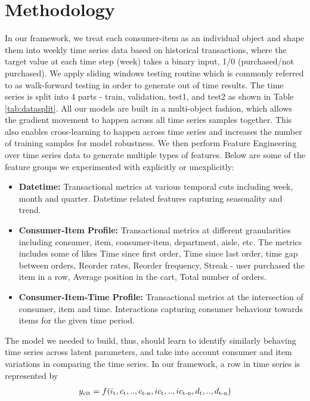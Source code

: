 \section{Methodology}
\label{sec:methodology}
In our framework, we treat each consumer-item as an individual object and shape them into weekly time series data
based on historical transactions, where the target value at each time step (week) takes a binary input, 1/0 
(purchased/not purchased).
We apply sliding windows testing routine which is commonly referred to as walk-forward testing in order to generate 
out of time results. The time series is split into 4 parts - train, validation, 
test1, and test2 as shown in Table \ref{tab:datasplit}. All our models are built in a multi-object 
fashion, which allows the gradient movement to happen across all time series samples together. This also enables 
cross-learning to happen across time series and increases the number of training samples for model 
robustness. We then perform Feature Engineering over time series data to generate multiple types of features. 
Below are some of the feature groups we experimented with explicitly or unexplicitly:
\begin{itemize}
\item {\bf Datetime:} Transactional metrics at various temporal cuts including week, month and quarter. 
Datetime related features capturing seasonality and trend.
\item {\bf Consumer-Item Profile:} Transactional metrics at different granularities including consumer, item,
consumer-item, department, aisle, etc. The metrics includes some of likes Time since first order, 
Time since last order, time gap between orders, Reorder rates, Reorder frequency, 
Streak - user purchased the item in a row, Average position in the cart, Total number of orders.
\item {\bf Consumer-Item-Time Profile:} Transactional metrics at the intersection of consumer, item and time.
Interactions capturing consumer behaviour towards items for the given time period.
\end{itemize}
The model we needed to build, thus, should learn to identify similarly behaving time series across latent
parameters, and take into account consumer and item variations in comparing the time series. In our framework, a row 
in time series is represented by
  \begin{equation}
    \begin{array}{l}
      y\textsubscript{cit}  = f(i\textsubscript{t}, c\textsubscript{t},..,c\textsubscript{t-n}, ic\textsubscript{t}
      ,..,ic\textsubscript{t-n}, d\textsubscript{t},..,d\textsubscript{t-n})
    \end{array}
    \label{eqn:fx}
  \end{equation}
